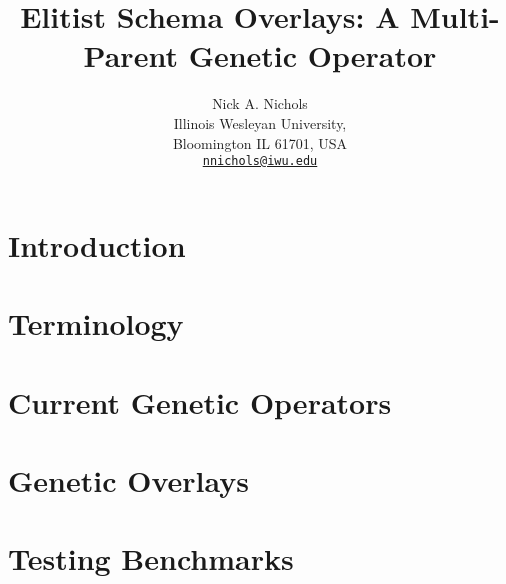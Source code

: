 \documentclass{article}
\makeatletter
\def \papertitle {Elitist Schema Overlays: A Multi-Parent Genetic Operator}
\def \paperauthors {Nick A. Nichols}
\def \paperinstitute {\small Illinois Wesleyan University, \\ \small Bloomington IL 61701, USA}
\def \paperemails {\small\href{mailto:nnichols@iwu.edu}{\nolinkurl{nnichols@iwu.edu}}}
\makeatother
\begin{document}
\title{\papertitle}
\author{\paperauthors \\ \paperinstitute \\ \paperemails}

\maketitle


\begin{abstract}

\end{abstract}








\section{Introduction} 
\label{sec:introduction}



\section{Terminology} 
\label{sec:terminology}



\section{Current Genetic Operators}
\label{sec:current}



\section{Genetic Overlays}
\label{sec:overlays}



\section{Testing Benchmarks}
\label{sec:testfunctions}

\end{document}
